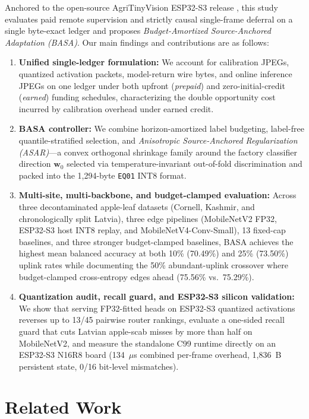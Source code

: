 \documentclass[preprint,12pt,authoryear]{elsarticle}
\begin{document}
Anchored to the open-source AgriTinyVision ESP32-S3 release \citep{agri}, this study evaluates paid remote supervision and strictly causal single-frame deferral on a single byte-exact ledger and proposes \emph{Budget-Amortized Source-Anchored Adaptation (BASA)}. Our main findings and contributions are as follows:
\begin{enumerate}
  \item \textbf{Unified single-ledger formulation:} We account for calibration JPEGs, quantized activation packets, model-return wire bytes, and online inference JPEGs on one ledger under both upfront (\emph{prepaid}) and zero-initial-credit (\emph{earned}) funding schedules, characterizing the double opportunity cost incurred by calibration overhead under earned credit.
  \item \textbf{BASA controller:} We combine horizon-amortized label budgeting, label-free quantile-stratified selection, and \emph{Anisotropic Source-Anchored Regularization (ASAR)}---a convex orthogonal shrinkage family around the factory classifier direction $\hat{\mathbf{w}}_0$ selected via temperature-invariant out-of-fold discrimination and packed into the 1,294-byte \texttt{EQ01} INT8 format.
  \item \textbf{Multi-site, multi-backbone, and budget-clamped evaluation:} Across three decontaminated apple-leaf datasets (Cornell, Kashmir, and chronologically split Latvia), three edge pipelines (MobileNetV2 FP32, ESP32-S3 host INT8 replay, and MobileNetV4-Conv-Small), 13 fixed-cap baselines, and three stronger budget-clamped baselines, BASA achieves the highest mean balanced accuracy at both 10\% (70.49\%) and 25\% (73.50\%) uplink rates while documenting the 50\% abundant-uplink crossover where budget-clamped cross-entropy edges ahead (75.56\% vs.\ 75.29\%).
  \item \textbf{Quantization audit, recall guard, and ESP32-S3 silicon validation:} We show that serving FP32-fitted heads on ESP32-S3 quantized activations reverses up to 13/45 pairwise router rankings, evaluate a one-sided recall guard that cuts Latvian apple-scab misses by more than half on MobileNetV2, and measure the standalone C99 runtime directly on an ESP32-S3 N16R8 board (134~$\mu$s combined per-frame overhead, 1,836~B persistent state, 0/16 bit-level mismatches).
\end{enumerate}

\section{Related Work}
\label{sec:related}
\end{document}
